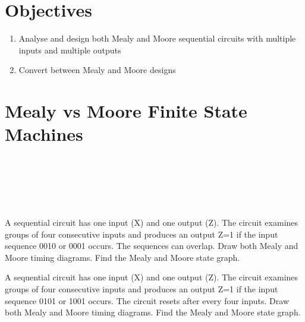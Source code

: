 
\section{Objectives}
\begin{enumerate}
  \item Analyse and design both Mealy and Moore sequential circuits with multiple inputs and multiple outputs
  \item Convert between Mealy and Moore designs
\end{enumerate}

\section{Mealy vs Moore Finite State Machines}
\begin{definition}~\cite[Sec~3.4]{harris2022digital}
\end{definition}
\vspace{5em}

\begin{definition}~\cite[Sec~3.4.3]{harris2022digital}
\end{definition}
\vspace{5em}

\begin{definition}~\cite[Sec~3.4.3]{harris2022digital}
\end{definition}
\vspace{5em}


\begin{example}
  A sequential circuit has one input (X) and one output (Z). The circuit
  examines groups of four consecutive inputs and produces an output Z=1 if the
  input sequence 0010 or 0001 occurs. The sequences can overlap. Draw both Mealy
  and Moore timing diagrams. Find the Mealy and Moore state graph.
\end{example}
\vspace{20em}

\begin{prob}
  A sequential circuit has one input (X) and one output (Z). The circuit
  examines groups of four consecutive inputs and produces an output Z=1 if the
  input sequence 0101 or 1001 occurs. The circuit resets after every four
  inputs. Draw both Mealy and Moore timing diagrams. Find the Mealy and Moore state graph.
\end{prob}
\vspace{20em}

